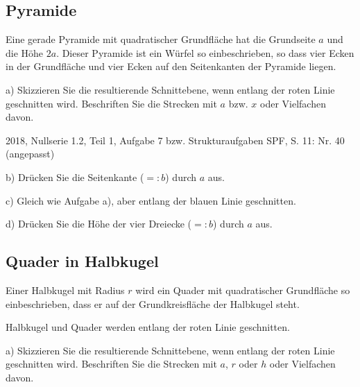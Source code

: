 \subsection{Pyramide}
Eine gerade Pyramide mit quadratischer Grundfläche hat die
Grundseite $a$ und die Höhe $2a$. Dieser Pyramide ist ein Würfel
so einbeschrieben, so dass vier Ecken in der Grundfläche und
vier Ecken auf den Seitenkanten der Pyramide liegen.

a) Skizzieren Sie die resultierende Schnittebene, wenn entlang der
roten Linie geschnitten wird. Beschriften Sie die Strecken mit $a$ bzw.
$x$ oder Vielfachen davon.

{\tiny{2018, Nullserie 1.2, Teil 1, Aufgabe 7 bzw. Strukturaufgaben SPF, S. 11: Nr. 40 (angepasst)}}



b) Drücken Sie die Seitenkante ($=:b$) durch $a$ aus.



c) Gleich wie Aufgabe a), aber entlang der blauen Linie geschnitten.



d) Drücken Sie die Höhe der vier Dreiecke ($=:b$) durch $a$ aus.

\subsection{Quader in Halbkugel}

Einer Halbkugel mit Radius $r$ wird ein Quader mit quadratischer
Grundfläche so einbeschrieben, dass er auf der Grundkreisfläche
der Halbkugel steht.

Halbkugel und Quader werden entlang der roten Linie geschnitten.


a) Skizzieren Sie die resultierende Schnittebene, wenn entlang der
roten Linie geschnitten wird. Beschriften Sie die Strecken mit $a$,
$r$ oder $h$ oder Vielfachen davon.


